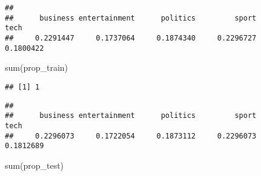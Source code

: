 \documentclass[
]{article}
\newenvironment{Shaded}{\begin{snugshade}}{\end{snugshade}}
\newcommand{\AttributeTok}[1]{\textcolor[rgb]{0.77,0.63,0.00}{#1}}
\newcommand{\ConstantTok}[1]{\textcolor[rgb]{0.00,0.00,0.00}{#1}}
\newcommand{\FloatTok}[1]{\textcolor[rgb]{0.00,0.00,0.81}{#1}}
\newcommand{\FunctionTok}[1]{\textcolor[rgb]{0.00,0.00,0.00}{#1}}
\newcommand{\NormalTok}[1]{#1}
\newcommand{\OtherTok}[1]{\textcolor[rgb]{0.56,0.35,0.01}{#1}}
\newcommand{\SpecialCharTok}[1]{\textcolor[rgb]{0.00,0.00,0.00}{#1}}
\begin{document}
\begin{Shaded}
\end{Shaded}

\begin{verbatim}
## 
##      business entertainment      politics         sport          tech 
##     0.2291447     0.1737064     0.1874340     0.2296727     0.1800422
\end{verbatim}

\begin{Shaded}
\begin{Highlighting}[]
\FunctionTok{sum}\NormalTok{(prop\_train)}
\end{Highlighting}
\end{Shaded}

\begin{verbatim}
## [1] 1
\end{verbatim}

\begin{Shaded}
\end{Shaded}

\begin{verbatim}
## 
##      business entertainment      politics         sport          tech 
##     0.2296073     0.1722054     0.1873112     0.2296073     0.1812689
\end{verbatim}

\begin{Shaded}
\begin{Highlighting}[]
\FunctionTok{sum}\NormalTok{(prop\_test)}
\end{Highlighting}
\end{Shaded}
\end{document}
